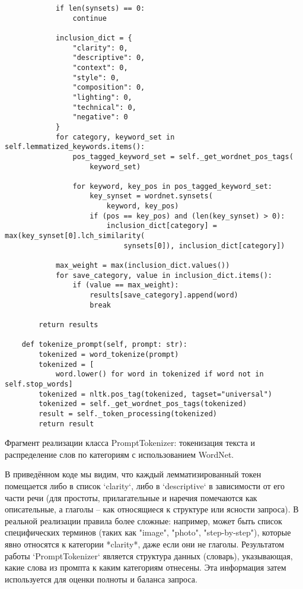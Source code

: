 \begin{verbatim}
            if len(synsets) == 0:
                continue

            inclusion_dict = {
                "clarity": 0,
                "descriptive": 0,
                "context": 0,
                "style": 0,
                "composition": 0,
                "lighting": 0,
                "technical": 0,
                "negative": 0
            }
            for category, keyword_set in self.lemmatized_keywords.items():
                pos_tagged_keyword_set = self._get_wordnet_pos_tags(
                    keyword_set)

                for keyword, key_pos in pos_tagged_keyword_set:
                    key_synset = wordnet.synsets(
                        keyword, key_pos)
                    if (pos == key_pos) and (len(key_synset) > 0):
                        inclusion_dict[category] = max(key_synset[0].lch_similarity(
                            synsets[0]), inclusion_dict[category])

            max_weight = max(inclusion_dict.values())
            for save_category, value in inclusion_dict.items():
                if (value == max_weight):
                    results[save_category].append(word)
                    break

        return results

    def tokenize_prompt(self, prompt: str):
        tokenized = word_tokenize(prompt)
        tokenized = [
            word.lower() for word in tokenized if word not in self.stop_words]
        tokenized = nltk.pos_tag(tokenized, tagset="universal")
        tokenized = self._get_wordnet_pos_tags(tokenized)
        result = self._token_processing(tokenized)
        return result
\end{verbatim}
Фрагмент реализации класса PromptTokenizer: токенизация текста и распределение слов по категориям с использованием WordNet.

В приведённом коде мы видим, что каждый лемматизированный токен помещается либо в список `clarity`, либо в `descriptive` в зависимости от его части речи (для простоты, прилагательные и наречия помечаются как описательные, а глаголы – как относящиеся к структуре или ясности запроса). В реальной реализации правила более сложные: например, может быть список специфических терминов (таких как "image", "photo", "step-by-step"), которые явно относятся к категории *clarity*, даже если они не глаголы. Результатом работы `PromptTokenizer` является структура данных (словарь), указывающая, какие слова из промпта к каким категориям отнесены. Эта информация затем используется для оценки полноты и баланса запроса.


